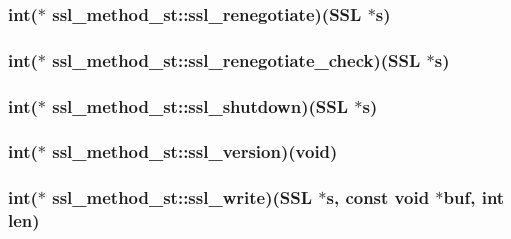 \hypertarget{structssl__method__st_af474c3e4e5290ad32871377dc31e91aa}{
\subsubsection[{ssl\-\_\-renegotiate}]{\setlength{\rightskip}{0pt plus 5cm}int($\ast$ ssl\-\_\-method\-\_\-st\-::ssl\-\_\-renegotiate)(S\-S\-L $\ast$s)}}\label{structssl__method__st_af474c3e4e5290ad32871377dc31e91aa}
\hypertarget{structssl__method__st_a88a73e9ebda59498197eb0e6d971d099}{
\subsubsection[{ssl\-\_\-renegotiate\-\_\-check}]{\setlength{\rightskip}{0pt plus 5cm}int($\ast$ ssl\-\_\-method\-\_\-st\-::ssl\-\_\-renegotiate\-\_\-check)(S\-S\-L $\ast$s)}}\label{structssl__method__st_a88a73e9ebda59498197eb0e6d971d099}
\hypertarget{structssl__method__st_a6965878add7a6a866cde2156d4aef5d1}{
\subsubsection[{ssl\-\_\-shutdown}]{\setlength{\rightskip}{0pt plus 5cm}int($\ast$ ssl\-\_\-method\-\_\-st\-::ssl\-\_\-shutdown)(S\-S\-L $\ast$s)}}\label{structssl__method__st_a6965878add7a6a866cde2156d4aef5d1}
\hypertarget{structssl__method__st_a49ddb57830dbd5357565521703cce6de}{
\subsubsection[{ssl\-\_\-version}]{\setlength{\rightskip}{0pt plus 5cm}int($\ast$ ssl\-\_\-method\-\_\-st\-::ssl\-\_\-version)(void)}}\label{structssl__method__st_a49ddb57830dbd5357565521703cce6de}
\hypertarget{structssl__method__st_a2828b8aad107d8eeed1a9525c22de276}{
\subsubsection[{ssl\-\_\-write}]{\setlength{\rightskip}{0pt plus 5cm}int($\ast$ ssl\-\_\-method\-\_\-st\-::ssl\-\_\-write)(S\-S\-L $\ast$s, const void $\ast$buf, int len)}}\label{structssl__method__st_a2828b8aad107d8eeed1a9525c22de276}
